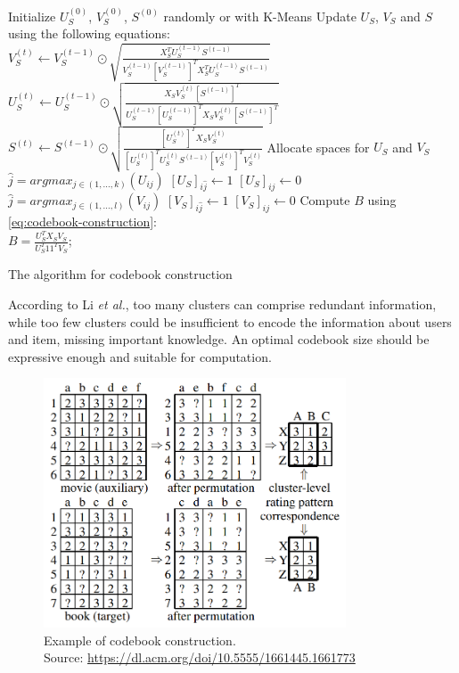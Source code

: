 \begin{algorithm}[H]
Initialize $U_S^{(0)}$, $V_S^{(0)}$, $S^{(0)}$ randomly or with K-Means\;
{
  Update $U_S$, $V_S$ and $S$ using the following equations:\\
  $V_S^{(t)} \gets V_S^{(t - 1)} \odot \sqrt{\frac{X_S^T U_S^{(t - 1)} S^{(t - 1)}}{V_S^{(t - 1)} [V_S^{(t - 1)}]^T X_S^T U_S^{(t - 1)} S^{(t - 1)}}}$\;
  $U_S^{(t)} \gets U_S^{(t - 1)} \odot \sqrt{\frac{X_S V_S^{(t)} [S^{(t - 1)}]^T}{U_S^{(t - 1)} [U_S^{(t - 1)}]^T X_S V_S^{(t)} [S^{(t - 1)}]^T}}$\;
  $S^{(t)} \gets S^{(t - 1)} \odot \sqrt{\frac{[U_S^{(t)}]^T X_S V_S^{(t)}}{[U_S^{(t)}]^T U_S^{(t)} S^{(t - 1)} [V_S^{(t)}]^T V_S^{(t)}}}$\;
}
Allocate spaces for $U_S$ and $V_S$\;
{
  $\hat{j} = argmax_{j \in (1,...,k)}(U_{ij})$\;
  $[U_S]_{i\hat{j}} \gets 1$\;
  {
    $[U_S]_{ij} \gets 0$\;
  }
}
{
  $\hat{j} = argmax_{j \in (1,...,l)}(V_{ij})$\;
  $[V_S]_{i\hat{j}} \gets 1$\;
  {
    $[V_S]_{ij} \gets 0$\;
  }
}
Compute $B$ using \autoref{eq:codebook-construction}:\\
$B = \frac{U_S^T X_S V_S}{U_S^T 11^T V_S}$;
\caption{The algorithm for codebook construction}
\end{algorithm}
\vskip 0.7cm
According to Li \textit{et al.}, too many clusters can comprise redundant information, while too few clusters could be insufficient to encode the information about users and item, missing important knowledge. An optimal codebook size should be expressive enough and suitable for computation.
\begin{figure}[hbt]
\centering
\includegraphics[width=0.8\textwidth]{pictures/codebook-construction}
\caption{Example of codebook construction.\\
Source: \url{https://dl.acm.org/doi/10.5555/1661445.1661773}}
\end{figure}


